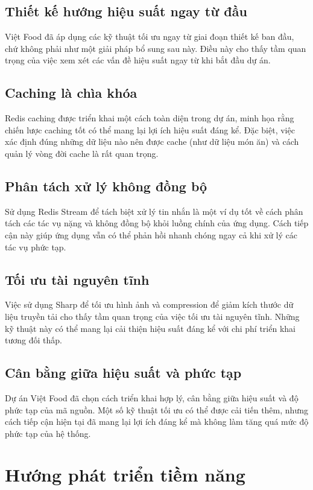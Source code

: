 \subsection{Thiết kế hướng hiệu suất ngay từ đầu}
Việt Food đã áp dụng các kỹ thuật tối ưu ngay từ giai đoạn thiết kế ban đầu, chứ không phải như một giải pháp bổ sung sau này. Điều này cho thấy tầm quan trọng của việc xem xét các vấn đề hiệu suất ngay từ khi bắt đầu dự án.

\subsection{Caching là chìa khóa}
Redis caching được triển khai một cách toàn diện trong dự án, minh họa rằng chiến lược caching tốt có thể mang lại lợi ích hiệu suất đáng kể. Đặc biệt, việc xác định đúng những dữ liệu nào nên được cache (như dữ liệu món ăn) và cách quản lý vòng đời cache là rất quan trọng.

\subsection{Phân tách xử lý không đồng bộ}
Sử dụng Redis Stream để tách biệt xử lý tin nhắn là một ví dụ tốt về cách phân tách các tác vụ nặng và không đồng bộ khỏi luồng chính của ứng dụng. Cách tiếp cận này giúp ứng dụng vẫn có thể phản hồi nhanh chóng ngay cả khi xử lý các tác vụ phức tạp.

\subsection{Tối ưu tài nguyên tĩnh}
Việc sử dụng Sharp để tối ưu hình ảnh và compression để giảm kích thước dữ liệu truyền tải cho thấy tầm quan trọng của việc tối ưu tài nguyên tĩnh. Những kỹ thuật này có thể mang lại cải thiện hiệu suất đáng kể với chi phí triển khai tương đối thấp.

\subsection{Cân bằng giữa hiệu suất và phức tạp}
Dự án Việt Food đã chọn cách triển khai hợp lý, cân bằng giữa hiệu suất và độ phức tạp của mã nguồn. Một số kỹ thuật tối ưu có thể được cải tiến thêm, nhưng cách tiếp cận hiện tại đã mang lại lợi ích đáng kể mà không làm tăng quá mức độ phức tạp của hệ thống.

\section{Hướng phát triển tiềm năng}

